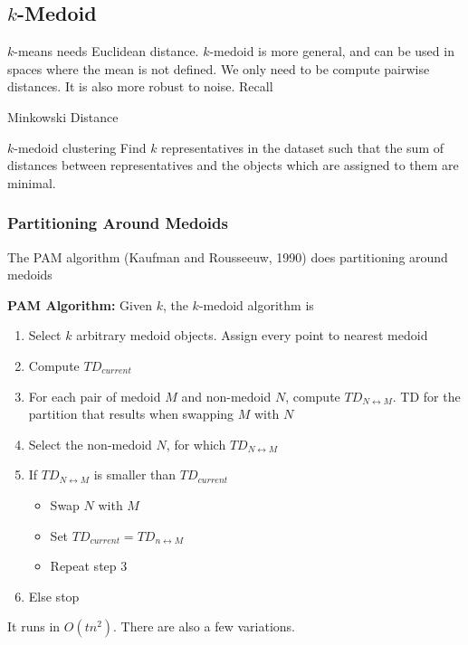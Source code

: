 \subsection{$k$-Medoid}
    $k$-means needs Euclidean distance. $k$-medoid is more general, and can be used in spaces where the mean is not defined. We only need to be compute pairwise distances. It is also more robust to noise. Recall 
    \begin{defi}
      Minkowski Distance
    \end{defi}
    
    \begin{defi}
      $k$-medoid clustering \newline
      Find $k$ representatives in the dataset such that the sum of distances between representatives and the objects which are assigned to them are minimal.
    \end{defi}
    
\subsubsection{Partitioning Around Medoids}
    The PAM algorithm (Kaufman and Rousseeuw, 1990) does partitioning around medoids
    \begin{defi}
     \textbf{PAM Algorithm:} Given $k$, the $k$-medoid algorithm is
    \begin{enumerate}
        \item Select $k$ arbitrary medoid objects. Assign every point to nearest medoid
        \item Compute $TD_{current}$
        \item For each pair of medoid $M$ and non-medoid $N$, compute $TD_{N \leftrightarrow M}$. TD for the partition that results when swapping $M$ with $N$
        \item Select the non-medoid $N$, for which $TD_{N \leftrightarrow M}$
        \item If $TD_{N \leftrightarrow M}$ is smaller than $TD_{current}$
            \begin{itemize}
                \item Swap $N$ with $M$
                \item Set $TD_{current} = TD_{n \leftrightarrow M}$
                 \item Repeat step 3
            \end{itemize}
        \item Else stop
    \end{enumerate}
    \end{defi}
    It runs in $O(tn^2)$. There are also a few variations. 
    
